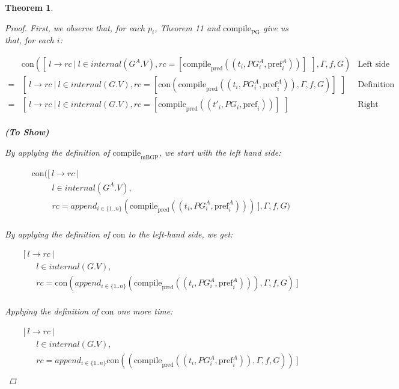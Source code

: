\documentclass[twocolumn, openany]{sig-alternate-10pt}
\newcommand{\Con}{\mathrm{con}}
\newcommand{\CompilePred}{\ensuremath{\mathrm{compile}_\mathrm{pred}}}
\newcommand{\CompilePg}{\ensuremath{\mathrm{compile}_\mathrm{PG}}}
\newcommand{\CompileMbgp}{\ensuremath{\mathrm{compile}_\mathrm{mBGP}}}
\newcommand{\Pref}{\ensuremath{\mathrm{pref}}}
\newtheorem{thm}{Theorem}
\begin{document}
\begin{thm}
\begin{proof}
    \noindent
    First, we observe that, for each $p_i$, Theorem 11 and $\CompilePg$ give us that, for each $i$:

    \[
    \begin{array}{lll}
    &   \Con([~ l \rightarrow rc ~\vert~ l \in internal(G^A.V), rc = 
        [\CompilePred((t_i, PG^A_i, \Pref^A_i))] ~~], \Gamma,f,G)     & \text{Left side} \\
    = & [~ l \rightarrow rc ~\vert~ l \in internal(G.V), rc = 
        [\Con(\CompilePred((t_i, PG^A_i, \Pref^A_i)), \Gamma,f,G)] ~~] & \text{Definition of con} \\
    = & [~ l \rightarrow rc ~\vert~ l \in internal(G.V), rc = [\CompilePred((t'_i, PG_i, \Pref_i))] ~~]
        & \text{Right side} \\
    \end{array}
    \]
 
    \vspace{1em}
    \noindent
    \textbf{(To Show)}

    \vspace{.4em}
    \noindent
    By applying the definition of $\CompileMbgp$, we start with the left hand side:

    \[ \begin{array}{l}
     ~~~~~ \Con([~ l \rightarrow rc ~\vert~ \\
     ~~~~~~~~~~~~~~~~ l \in internal(G^A.V), \\ 
     ~~~~~~~~~~~~~~~~ rc = append_{i \in \{1..n\}}(\CompilePred((t_i, PG^A_i, \Pref^A_i))) ~], \Gamma,f,G) \\
    \end{array} \]%

    \noindent
    By applying the definition of $\Con$ to the left-hand side, we get:

    \[ \begin{array}{l}
     ~~~~~ [~ l \rightarrow rc ~\vert~ \\
     ~~~~~~~~~~~~ l \in internal(G.V), \\ 
     ~~~~~~~~~~~~ rc = \Con(append_{i \in \{1..n\}}(\CompilePred((t_i, PG^A_i, \Pref^A_i))), \Gamma,f,G)  ~]\\
    \end{array} \]%

    \noindent
    Applying the definition of $\Con$ one more time:

    \[ \begin{array}{l}
     ~~~~~ [~ l \rightarrow rc ~\vert~ \\
     ~~~~~~~~~~~~ l \in internal(G.V), \\ 
     ~~~~~~~~~~~~ rc = append_{i \in \{1..n\}}\Con((\CompilePred((t_i, PG^A_i, \Pref^A_i)), \Gamma,f,G) ) ~]\\
    \end{array} \]%


\end{proof}
\end{thm}
\end{document}
